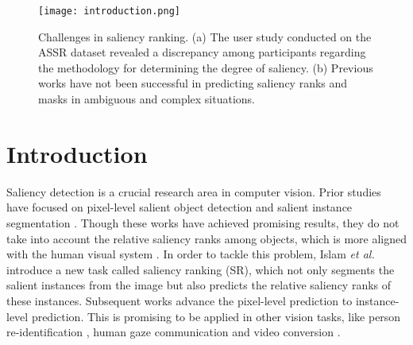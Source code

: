 \documentclass[sigconf]{acmart}
\def\etal{{\em et al.}}
\begin{document}
\begin{CCSXML}

\end{CCSXML}



\renewcommand\footnotetextcopyrightpermission[1]{}
\maketitle

\begin{figure}
	\begin{center}
		\texttt{[image: introduction.png]}
		\caption{Challenges in saliency ranking. (a) The user study conducted on the ASSR dataset revealed a discrepancy among participants regarding the methodology for determining the degree of saliency. (b) Previous works have not been successful in predicting saliency ranks and masks in ambiguous and complex situations.
		}\label{fig:introduction}
	\end{center}
\end{figure}

\section{Introduction}
Saliency detection is a crucial research area in computer vision. Prior studies have focused on pixel-level salient object detection \cite{liu2010learning,cheng2014global,yang2013saliency,feng2019attentive,zhao2019egnet,wei2020label,zhang2021auto,siris2021scene,zhao2021complementary,gao2020highly} and salient instance segmentation \cite{li2017instance,wu2021regularized,liu2021scg,tian2020weakly,pei2022transformer}. Though these works have achieved promising results, they do not take into account the relative saliency ranks among objects, which is more aligned with the human visual system \cite{seth2022theories}. In order to tackle this problem, Islam \etal{} \cite{islam2018revisiting} introduce a new task called saliency ranking (SR), which not only segments the salient instances from the image but also predicts the relative saliency ranks of these instances. Subsequent works \cite{siris2020inferring,fang2021salient,liu2021instance,tian2022bi} advance the pixel-level prediction \cite{islam2018revisiting} to instance-level prediction. This is promising to be applied in other vision tasks, like person re-identification \cite{chen2022saliency,richardwebster2022doppelganger}, human gaze communication \cite{fan2019understanding} and video conversion \cite{zhu2021horizontal}.
\end{document}
